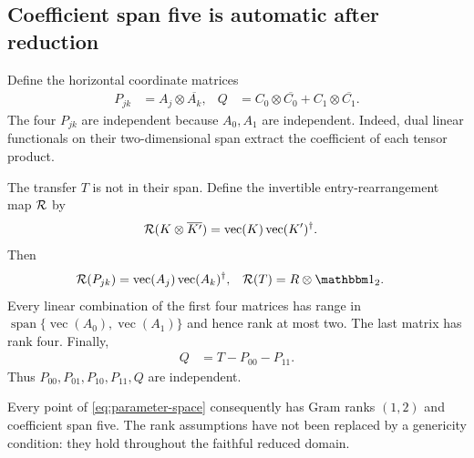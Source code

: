 \subsection{Coefficient span five is automatic after reduction}

Define the horizontal coordinate matrices
\begin{align}
	P_{jk} & =A_j\otimes\overline{A_k},
	       &
	Q      & =C_0\otimes\overline{C_0}
	+C_1\otimes\overline{C_1}.
	\label{eq:coordinates}
\end{align}
The four $P_{jk}$ are independent because $A_0,A_1$ are independent.
Indeed, dual linear functionals on their two-dimensional span
extract the coefficient of each tensor product.

The transfer $T$ is not in their span. Define the invertible
entry-rearrangement map $\mathcal{R}$ by
\begin{align}
	\mathcal{R}(K\otimes\overline{K'})
	 & =\operatorname{vec}(K)\operatorname{vec}(K')^\dagger.
\end{align}
Then
\begin{align}
	\mc R(P_{jk})
	         & =\operatorname{vec}(A_j)\operatorname{vec}(A_k)^\dagger,
	         &
	\mc R(T) & =R\otimes\Id_2.
	\label{eq:reshuffle}
\end{align}
Every linear combination of the first four matrices has range in
$\operatorname{span}\{\operatorname{vec}(A_0),
	\operatorname{vec}(A_1)\}$ and hence rank at most two.
The last matrix has rank four. Finally,
\begin{align}
	Q & =T-P_{00}-P_{11}.
	\label{eq:Q}
\end{align}
Thus $P_{00},P_{01},P_{10},P_{11},Q$ are independent.

Every point of \cref{eq:parameter-space} consequently has Gram ranks
$(1,2)$ and coefficient span five. The rank assumptions have not
been replaced by a genericity condition: they hold throughout the
faithful reduced domain.
